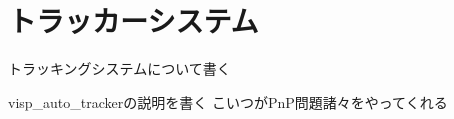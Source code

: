 \section{トラッカーシステム}
\label{implement_tracker}
トラッキングシステムについて書く

visp\_auto\_trackerの説明を書く
こいつがPnP問題諸々をやってくれる
